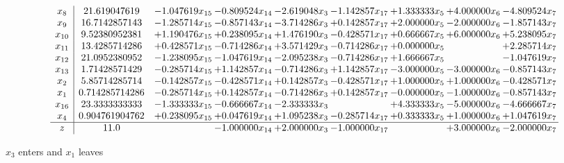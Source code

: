 \documentclass[10pt]{article}
\begin{document}
 \[\begin{array}{c| c c@{\hskip 2pt} c@{\hskip 2pt} c@{\hskip 2pt} c@{\hskip 2pt} c@{\hskip 2pt} c@{\hskip 2pt} c@{\hskip 2pt} }
 x_{8}   &  21.619047619 & -1.047619 x_{15} & -0.809524 x_{14} & -2.619048 x_{3} & -1.142857 x_{17} & + 1.333333 x_{5} & + 4.000000 x_{6} & -4.809524 x_{7}\\
 x_{9}   &  16.7142857143 & -1.285714 x_{15} & -0.857143 x_{14} & -3.714286 x_{3} & + 0.142857 x_{17} & + 2.000000 x_{5} & -2.000000 x_{6} & -1.857143 x_{7}\\
 x_{10}   &  9.52380952381 & + 1.190476 x_{15} & + 0.238095 x_{14} & + 1.476190 x_{3} & -0.428571 x_{17} & + 0.666667 x_{5} & + 6.000000 x_{6} & + 5.238095 x_{7}\\
 x_{11}   &  13.4285714286 & + 0.428571 x_{15} & -0.714286 x_{14} & + 3.571429 x_{3} & -0.714286 x_{17} & + 0.000000 x_{5} &   & + 2.285714 x_{7}\\
 x_{12}   &  21.0952380952 & -1.238095 x_{15} & -1.047619 x_{14} & -2.095238 x_{3} & -0.714286 x_{17} & + 1.666667 x_{5} &   & -1.047619 x_{7}\\
 x_{13}   &  1.71428571429 & -0.285714 x_{15} & + 1.142857 x_{14} & -0.714286 x_{3} & + 1.142857 x_{17} & -3.000000 x_{5} & -3.000000 x_{6} & -0.857143 x_{7}\\
 x_{2}   &  5.85714285714 & -0.142857 x_{15} & -0.428571 x_{14} & + 0.142857 x_{3} & -0.428571 x_{17} & + 1.000000 x_{5} & + 1.000000 x_{6} & -0.428571 x_{7}\\
 x_{1}   &  0.714285714286 & -0.285714 x_{15} & + 0.142857 x_{14} & -0.714286 x_{3} & + 0.142857 x_{17} & -0.000000 x_{5} & -1.000000 x_{6} & -0.857143 x_{7}\\
 x_{16}   &  23.3333333333 & -1.333333 x_{15} & -0.666667 x_{14} & -2.333333 x_{3} &   & + 4.333333 x_{5} & -5.000000 x_{6} & -4.666667 x_{7}\\
 x_{4}   &  0.904761904762 & + 0.238095 x_{15} & + 0.047619 x_{14} & + 1.095238 x_{3} & -0.285714 x_{17} & + 0.333333 x_{5} & + 1.000000 x_{6} & + 1.047619 x_{7}\\
\hline
z    &  11.0  &   & -1.000000 x_{14} & + 2.000000 x_{3} & -1.000000 x_{17} &   & + 3.000000 x_{6} & -2.000000 x_{7}\\
\end{array}\]


 $ x_{3} $ enters and $ x_{1} $ leaves 
\end{document}
